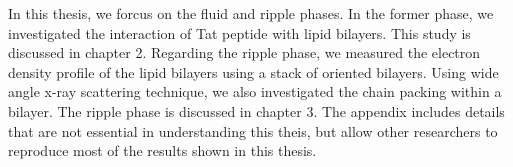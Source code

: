 In this thesis, we forcus on the fluid and ripple phases. In the former phase,
we investigated the interaction of Tat peptide with lipid bilayers. 
This study is discussed in chapter 2.
Regarding the ripple phase, we measured the electron density profile of the lipid
bilayers using a stack of oriented bilayers. Using wide angle x-ray scattering
technique, we also investigated the chain packing within a bilayer. 
The ripple phase is discussed in chapter 3. 
The appendix includes details that are not essential in understanding this
theis, but allow other researchers to reproduce most of the results shown in 
this thesis.